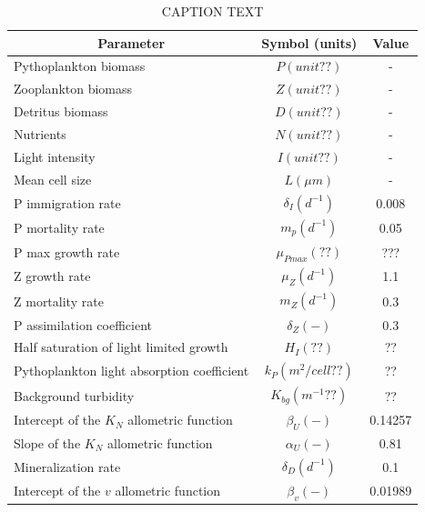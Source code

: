 \begin{table}[H]
\centering
\caption{CAPTION TEXT}
\label{tab:param}
\begin{tabular}{lcc}
\hline
\multicolumn{1}{c}{Parameter}               & Symbol (units)                    & Value     \\ \hline
Pythoplankton biomass                       & $P (unit??)$                      & -         \\
Zooplankton biomass                         & $Z (unit??)$                      & -         \\
Detritus biomass                            & $D (unit??)$                      & -         \\
Nutrients                                   & $N (unit??)$                      & -         \\
Light intensity                             & $I (unit??)$                      & -         \\
Mean cell size                              & $L (\mu m)$                       & -         \\
P immigration rate                          & $\delta_I (d^{-1})$               & 0.008     \\
P mortality rate                            & $m_p (d^{-1})$                    & 0.05      \\
P max growth rate                           & $\mu_{Pmax} (??)$                 & ???       \\
Z growth rate                               & $\mu_Z (d^{-1})$                  & 1.1       \\
Z mortality rate                            & $m_Z (d^{-1})$                    & 0.3       \\
P assimilation coefficient                  & $\delta_Z (-)$                    & 0.3       \\
Half saturation of light limited growth     & $H_I (??)$                        & ??        \\
Pythoplankton light absorption coefficient  & $k_P (m^2/cell??)$                & ??        \\
Background turbidity                        & $K_{bg} (m^{-1} ??)$              & ??        \\
Intercept of the $K_N$ allometric function  & $\beta_U (-)$                     & 0.14257   \\
Slope of the $K_N$ allometric function      & $\alpha_U (-)$                    & 0.81      \\
Mineralization rate                         & $\delta_D (d^{-1})$               & 0.1       \\
Intercept of the $v$ allometric function    & $\beta_v (-)$                     & 0.01989   \\
\hline
\end{tabular}
\end{table}
